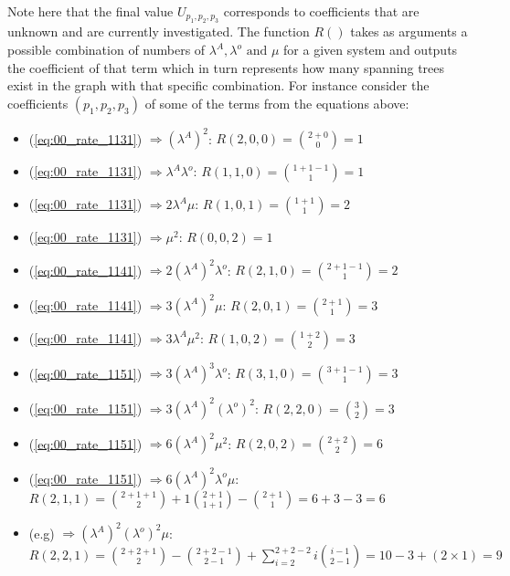 Note here that the final value \(U_{p_1,p_2,p_3}\) corresponds to coefficients that are unknown and are currently investigated. 
The function \(R()\) takes as arguments a possible combination of numbers of \(\lambda^A, \lambda^o \text{ and } \mu \) for a given system and outputs the coefficient of that term which in turn represents how many spanning trees exist in the graph with that specific combination. 
For instance consider the coefficients \((p_1,p_2,p_3)\) of some of the terms from the equations above:

\begin{multicols}{2}
    \begin{itemize}
        \item (\ref{eq:00_rate_1131}) \( \Rightarrow (\lambda^A)^2\): \(R(2,0,0) = \binom{2+0}{0} = 1\)
        \item (\ref{eq:00_rate_1131}) \( \Rightarrow \lambda^A \lambda^o\): \(R(1,1,0) = \binom{1+1-1}{1} = 1\)
        \item (\ref{eq:00_rate_1131}) \( \Rightarrow 2 \lambda^A \mu\): \(R(1,0,1) = \binom{1+1}{1} = 2\)
        \item (\ref{eq:00_rate_1131}) \( \Rightarrow \mu^2\): \(R(0,0,2) = 1\)
        \item (\ref{eq:00_rate_1141}) \( \Rightarrow 2(\lambda^A)^2 \lambda^o\): \(R(2,1,0) = \binom{2+1-1}{1} = 2\)
        \item (\ref{eq:00_rate_1141}) \( \Rightarrow 3(\lambda^A)^2 \mu\): \(R(2,0,1) = \binom{2+1}{1} = 3\)
        \item (\ref{eq:00_rate_1141}) \( \Rightarrow 3 \lambda^A \mu^2\): \(R(1,0,2) = \binom{1+2}{2} = 3\)
        \item (\ref{eq:00_rate_1151}) \( \Rightarrow 3 (\lambda^A)^3 \lambda^o\): \(R(3,1,0) = \binom{3+1-1}{1} = 3\)
        \item (\ref{eq:00_rate_1151}) \( \Rightarrow 3 (\lambda^A)^2 (\lambda^o)^2 \): \(R(2,2,0) = \binom{3}{2} = 3\)
        \item (\ref{eq:00_rate_1151}) \( \Rightarrow 6 (\lambda^A)^2 \mu ^ 2\): \(R(2,0,2) = \binom{2+2}{2} = 6\)
    \end{itemize}
\end{multicols}

\begin{itemize}
    \item (\ref{eq:00_rate_1151}) \( \Rightarrow 6 (\lambda^A)^2 \lambda^o \mu\): \(R(2,1,1) = \binom{2+1+1}{2} + 1\binom{2+1}{1+1} - \binom{2+1}{1} = 6 + 3 - 3 = 6\)
    \item \small{(e.g)} \( \Rightarrow (\lambda^A)^2 (\lambda^o)^2 \mu\): \(R(2,2,1) = \binom{2+2+1}{2} - \binom{2+2-1}{2-1} + \sum_{i=2}^{2+2-2} i\binom{i-1}{2-1} = 10 - 3 + (2 \times 1) = 9\)
\end{itemize}




